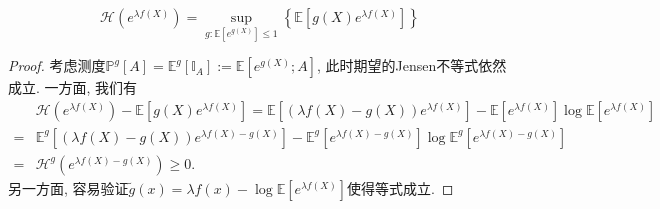 \begin{theorem}[熵的变分表示]\label{thm:VariationalRepresentationForEntropy}
	\begin{equation}\label{eq:VariationalRepresentationForEntropy}
		\mathcal{H}(e^{\lambda f(X)})
		= \sup_{g \colon \mathbb{E}[e^{g(X)}] \leq 1} \left\{ \mathbb{E} \left[g(X) e^{\lambda f(X)} \right] \right\}
	\end{equation}
\end{theorem}
\begin{proof}
	考虑测度$\mathbb{P}^g[A] = \mathbb{E}^g [\mathbb{I}_A] := \mathbb{E}[e^{g(X)}; A]$, 此时期望的Jensen不等式依然成立. 
	一方面, 我们有
	\begin{align*}
		&\mathcal{H}(e^{\lambda f(X)}) - \mathbb{E}[g(X) e^{\lambda f(X)}]
		= \mathbb{E}\left[ (\lambda f(X) - g(X)) e^{\lambda f(X)} \right] - \mathbb{E}[ e^{\lambda f(X)}] \log \mathbb{E}[ e^{\lambda f(X)}] \\
		=& \mathbb{E}^g  \left[ (\lambda f(X) - g(X)) e^{\lambda f(X) - g(X)} \right] - \mathbb{E}^g[ e^{\lambda f(X) - g(X)}] \log \mathbb{E}^g[ e^{\lambda f(X) - g(X)}] \\
		=& \mathcal{H}^g(e^{\lambda f(X) - g(X)}) \geq 0. 
	\end{align*}
	另一方面, 容易验证$\tilde g(x) = \lambda f(x) - \log \mathbb{E}[e^{\lambda f(X)}]$使得等式成立. 
\end{proof}

